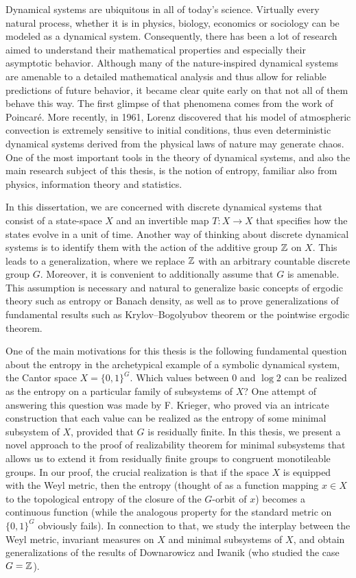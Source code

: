 Dynamical systems are ubiquitous in all of today's science.
%
Virtually every natural process, whether it is in physics, biology, economics or sociology can be modeled as a dynamical system. 
%
Consequently, there has been a lot of research aimed to understand their mathematical properties and especially their asymptotic behavior. 
%
Although many of the nature-inspired dynamical systems are amenable to a detailed mathematical analysis and thus allow for reliable predictions of future behavior, it became clear quite early on that not all of them behave this way.
%
The first glimpse of that phenomena comes from the work of Poincar\'e.
% 
More recently, in 1961, Lorenz discovered that his model of atmospheric convection is extremely sensitive to initial conditions, thus even deterministic dynamical systems derived from the physical laws of nature may generate chaos. 
%
One of the most important tools in the theory of dynamical systems, and also the main research subject of this thesis, is the notion of entropy, familiar also from physics, information theory and statistics.
%



In this dissertation, we are concerned with discrete dynamical systems that consist of a state-space $X$ and an invertible map $T\colon X\to X$ that specifies how the states evolve in a unit of time. 
%
Another way of thinking about discrete dynamical systems is to identify them with the action of the additive group $\mathbb{Z}$ on $X$.
%
This leads to a generalization, where we replace $\mathbb{Z}$ with an arbitrary countable discrete group $G$.
%
Moreover, it is convenient to additionally assume that $G$ is amenable. This assumption is necessary and natural to generalize basic concepts of ergodic theory such as entropy or Banach density, as well as to prove generalizations of fundamental results such as Krylov–Bogolyubov theorem or the pointwise ergodic theorem.
%


One of the main motivations for this thesis is the following fundamental question about the entropy in the archetypical example of a symbolic dynamical system, the Cantor space $X=\{0,1\}^G$. 
%
Which values between $0$ and $\log 2$ can be realized as the entropy on a particular family of subsystems of $X$? 
%
One attempt of answering this question was made by F. Krieger, who proved via an intricate construction that each value can be realized as the entropy of some minimal subsystem of $X$, provided that $G$ is residually finite.
%
In this thesis, we present  a novel approach to the proof of realizability theorem for minimal subsystems that allows us to extend it from residually finite groups to congruent monotileable groups.
%
In our proof, the crucial realization is that if the space $X$ is equipped with the Weyl metric, then the entropy (thought of as a function mapping $x\in X$ to the topological entropy of the closure of the $G$-orbit of $x$) becomes a continuous function (while the analogous property for the standard metric on $\{0,1\}^G$ obviously fails).
%
In connection to that, we study the interplay between the Weyl metric, invariant measures on $X$ and minimal subsystems of $X$, and obtain generalizations of the results of Downarowicz and Iwanik (who studied the case $G=\mathbb{Z}$). 


